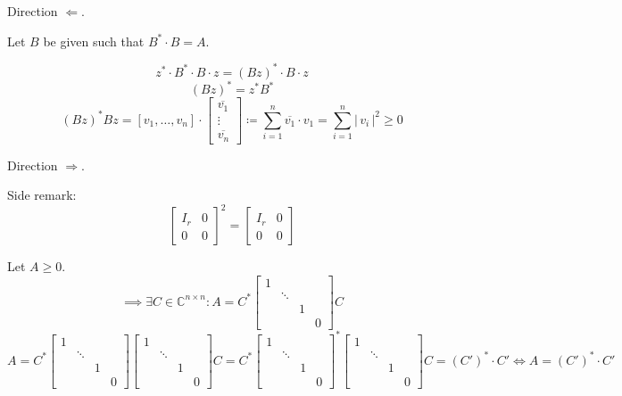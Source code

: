 \documentclass[a4paper]{article}
\theoremstyle{definition}
\newcommand\card[1]{\left|\,#1\,\right|}
\begin{document}
Direction $\Leftarrow$.

Let $B$ be given such that $B^* \cdot B = A$.

\[ z^* \cdot B^* \cdot B \cdot z = (Bz)^* \cdot B \cdot z \]
\[ (Bz)^* = z^* B^* \]
\[ (Bz)^* Bz = [v_1, \ldots, v_n] \cdot \begin{bmatrix} \overline{v_1} \\ \vdots \\ \overline{v_n} \end{bmatrix} \coloneqq \sum_{i=1}^n \overline{v_1} \cdot v_1 = \sum_{i=1}^n \card{v_i}^2 \geq 0 \]

Direction $\Rightarrow$.

Side remark:
\[
  \begin{bmatrix} I_r & 0 \\ 0 & 0 \end{bmatrix}^2 =
  \begin{bmatrix} I_r & 0 \\ 0 & 0 \end{bmatrix}
\]

Let $A \geq 0$.
\[
  \implies \exists C \in \mathbb C^{n \times n}:
  A = C^* \begin{bmatrix} 1 & & & \\ & \ddots & & \\ & & 1 & \\ & & & 0 \end{bmatrix} C
\] \[
  A = C^* \begin{bmatrix} 1 & & & \\ & \ddots & & \\ & & 1 & \\ & & & 0 \end{bmatrix} \begin{bmatrix} 1 & & & \\ & \ddots & & \\ & & 1 & \\ & & & 0 \end{bmatrix} C = C^* \begin{bmatrix} 1 & & & \\ & \ddots & & \\ & & 1 & \\ & & & 0 \end{bmatrix}^* \begin{bmatrix} 1 & & & \\ & \ddots & & \\ & & 1 & \\ & & & 0 \end{bmatrix} C = (C')^* \cdot C' \iff A = (C')^* \cdot C'
\]
\end{document}
